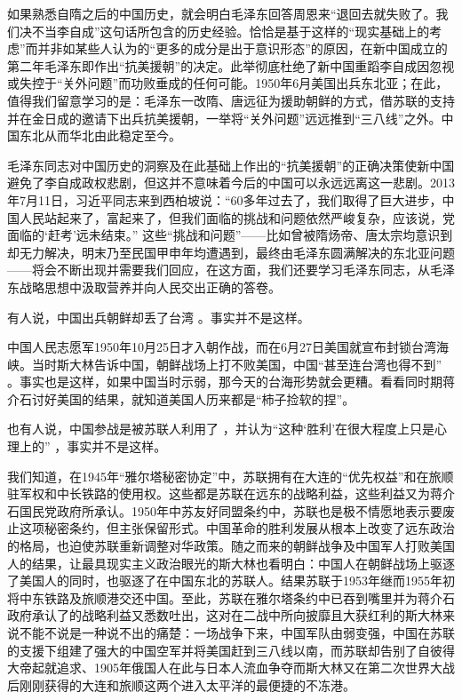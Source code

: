 \documentclass[UTF8, 12pt, a4paper]{ctexrep}
\begin{document}
如果熟悉自隋之后的中国历史，就会明白毛泽东回答周恩来“退回去就失败了。我们决不当李自成”这句话所包含的历史经验。恰恰是基于这样的“现实基础上的考虑”而并非如某些人认为的“更多的成分是出于意识形态”的原因，在新中国成立的第二年毛泽东即作出“抗美援朝”的决定。此举彻底杜绝了新中国重蹈李自成因忽视或失控于“关外问题”而功败垂成的任何可能。1950年6月美国出兵东北亚；在此，值得我们留意学习的是：毛泽东一改隋、唐远征为援助朝鲜的方式，借苏联的支持并在金日成的邀请下出兵抗美援朝，一举将“关外问题”远远推到“三八线”之外。中国东北从而华北由此稳定至今。

毛泽东同志对中国历史的洞察及在此基础上作出的“抗美援朝”的正确决策使新中国避免了李自成政权悲剧，但这并不意味着今后的中国可以永远远离这一悲剧。2013年7月11日，习近平同志来到西柏坡说：“60多年过去了，我们取得了巨大进步，中国人民站起来了，富起来了，但我们面临的挑战和问题依然严峻复杂，应该说，党面临的‘赶考’远未结束。” 这些“挑战和问题”——比如曾被隋炀帝、唐太宗均意识到却无力解决，明末乃至民国甲申年均遭遇到，最终由毛泽东圆满解决的东北亚问题——将会不断出现并需要我们回应，在这方面，我们还要学习毛泽东同志，从毛泽东战略思想中汲取营养并向人民交出正确的答卷。

有人说，中国出兵朝鲜却丢了台湾 。事实并不是这样。

中国人民志愿军1950年10月25日才入朝作战，而在6月27日美国就宣布封锁台湾海峡。当时斯大林告诉中国，朝鲜战场上打不败美国，中国“甚至连台湾也得不到” 。事实也是这样，如果中国当时示弱，那今天的台海形势就会更糟。看看同时期蒋介石讨好美国的结果，就知道美国人历来都是“柿子捡软的捏”。

也有人说，中国参战是被苏联人利用了 ，并认为“这种‘胜利’在很大程度上只是心理上的” ，事实并不是这样。

我们知道，在1945年“雅尔塔秘密协定”中，苏联拥有在大连的“优先权益”和在旅顺驻军权和中长铁路的使用权。这些都是苏联在远东的战略利益，这些利益又为蒋介石国民党政府所承认。1950年中苏友好同盟条约中，苏联也是极不情愿地表示要废止这项秘密条约，但主张保留形式。中国革命的胜利发展从根本上改变了远东政治的格局，也迫使苏联重新调整对华政策。随之而来的朝鲜战争及中国军人打败美国人的结果，让最具现实主义政治眼光的斯大林也看明白：中国人在朝鲜战场上驱逐了美国人的同时，也驱逐了在中国东北的苏联人。结果苏联于1953年继而1955年初将中东铁路及旅顺港交还中国。至此，苏联在雅尔塔条约中已吞到嘴里并为蒋介石政府承认了的战略利益又悉数吐出，这对在二战中所向披靡且大获红利的斯大林来说不能不说是一种说不出的痛楚：一场战争下来，中国军队由弱变强，中国在苏联的支援下组建了强大的中国空军并将美国赶到三八线以南，而苏联却告别了自彼得大帝起就追求、1905年俄国人在此与日本人流血争夺而斯大林又在第二次世界大战后刚刚获得的大连和旅顺这两个进入太平洋的最便捷的不冻港。
\end{document}
